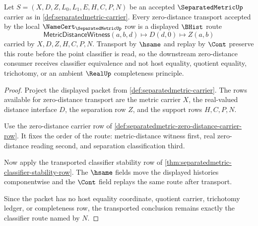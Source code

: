 \begin{theorem}\label{thm:separatedmetric-zero-distance-scope}
Let $S=(X,D,Z,L_0,L_1,E,H,C,P,N)$ be an accepted $\SeparatedMetricUp$ carrier as in \autoref{def:separatedmetric-carrier}. Every zero-distance transport accepted by the local $\NameCert_{\SeparatedMetricUp}$ row is a displayed $\BHist$ route
$$
\mathsf{MetricDistanceWitness}(a,b,d) \longmapsto D(d,0) \longmapsto Z(a,b)
$$
carried by $X,D,Z,H,C,P,N$. Transport by $\hsame$ and replay by $\Cont$ preserve this route before the point classifier is read, so the downstream zero-distance consumer receives classifier equivalence and not host equality, quotient equality, trichotomy, or an ambient $\RealUp$ completeness principle.
\end{theorem}
\begin{proof}
Project the displayed packet from \autoref{def:separatedmetric-carrier}. The rows available for zero-distance transport are the metric carrier $X$, the real-valued distance interface $D$, the separation row $Z$, and the support rows $H,C,P,N$.

Use the zero-distance carrier row of \autoref{def:separatedmetric-zero-distance-carrier-row}. It fixes the order of the route: metric-distance witness first, real zero-distance reading second, and separation classification third.

Now apply the transported classifier stability row of \autoref{thm:separatedmetric-classifier-stability-row}. The $\hsame$ fields move the displayed histories componentwise and the $\Cont$ field replays the same route after transport.

Since the packet has no host equality coordinate, quotient carrier, trichotomy ledger, or completeness row, the transported conclusion remains exactly the classifier route named by $N$.
\end{proof}

